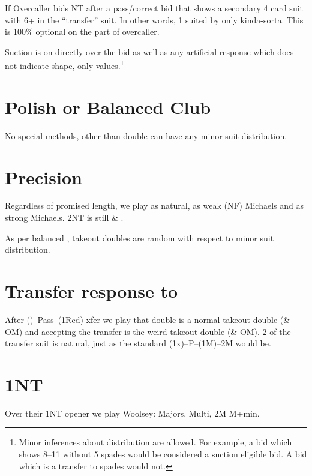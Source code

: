 \documentclass[tom-ari]{subfile}
\begin{document}
	If Overcaller bids NT after a pass/correct bid that shows a secondary 4 card suit with 6+ in the ``transfer'' suit. In other words, 1 suited by only kinda-sorta. This is 100\% optional on the part of overcaller.
	
	Suction is on directly over the  bid as well as any artificial response which does not indicate shape, only values.\footnote{Minor inferences about distribution are allowed. For example, a  bid which shows 8--11 without 5 spades would be considered a suction eligible bid. A  bid which is a transfer to spades would not.}
	
	\section{Polish or Balanced Club}
	
	No special methods, other than double can have any minor suit distribution.
	
	
	\section[Precision 1D]{Precision }
	
	Regardless of promised length, we play  as natural,  as weak (NF) Michaels and  as strong Michaels. 2NT is still \heartsuit \& \clubsuit.
	
	As per balanced , takeout doubles are random with respect to minor suit distribution.
	
	\section[Transfer response to 1C]{Transfer response to }
	
	After ()--Pass--(1Red) xfer we play that double is a normal takeout double (\diamondsuit \& OM) and accepting the transfer is the weird takeout double (\clubsuit \& OM). 2 of the transfer suit is natural, just as the standard (1x)--P--(1M)--2M would be.
	
	\section{1NT}
	
	Over their 1NT opener we play Woolsey:   Majors,  Multi, 2M M+min.
	
\end{document}
